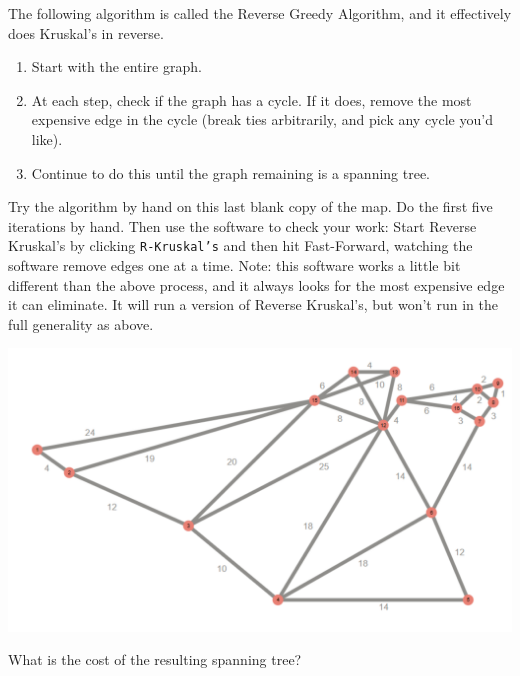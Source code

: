 \documentclass[fullpage,fleqn,leqno]{article}
\begin{document}
\vspace*{6\baselineskip}

\newpage

The following algorithm is called the Reverse Greedy Algorithm, and it
effectively does Kruskal's in reverse.

\begin{enumerate}
\item Start with the entire graph.
\item At each step, check if the graph has a cycle. If it does, remove
the most expensive edge in the cycle (break ties arbitrarily, and pick any cycle you'd like).
\item Continue to do this until the graph remaining is a spanning tree.
\end{enumerate}
\vspace*{1\baselineskip}

Try the algorithm by hand on this last blank copy of the map.  Do the first five iterations by hand.  Then use the software to check your work:  Start Reverse Kruskal's by clicking \texttt{R-Kruskal's} and then hit Fast-Forward, watching the software remove edges one at a time.  Note: this software works a little bit different than the above process, and it always looks for the most expensive edge it can eliminate.  It will run a version of Reverse Kruskal's, but won't run in the full generality as above.

\vspace*{1.5\baselineskip}

\begin{center}
  \includegraphics[width=.9\textwidth]{EmptyMST.pdf}
\end{center}

\vspace*{\baselineskip}

What is
the cost of the resulting spanning tree? 
\end{document}
